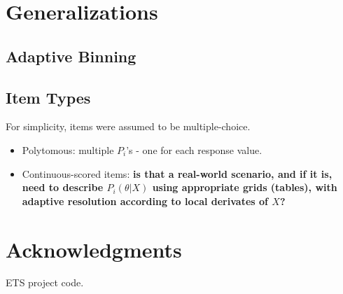 \documentclass{article}
\begin{document}
\section{Generalizations}
\label{general}

\subsection{Adaptive Binning}
\label{adaptive_grid}

\subsection{Item Types}
For simplicity, items were assumed to be multiple-choice.
\begin{itemize}
	\item Polytomous: multiple $P_i$'s - one for each response value.
	\item Continuous-scored items: {\bf is that a real-world scenario, and if it is, 
	need to describe $P_i(\theta|X)$ using appropriate grids (tables), with adaptive resolution
	according to local derivates of $X$?}
\end{itemize}

\section{Acknowledgments}
ETS project code.



\end{document}

